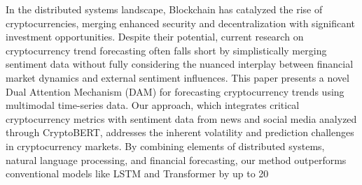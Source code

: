In the distributed systems landscape, Blockchain has catalyzed the rise of cryptocurrencies, merging enhanced security and decentralization with significant investment opportunities. Despite their potential, current research on cryptocurrency trend forecasting often falls short by simplistically merging sentiment data without fully considering the nuanced interplay between financial market dynamics and external sentiment influences. This paper presents a novel Dual Attention Mechanism (DAM) for forecasting cryptocurrency trends using multimodal time-series data. Our approach, which integrates critical cryptocurrency metrics with sentiment data from news and social media analyzed through CryptoBERT, addresses the inherent volatility and prediction challenges in cryptocurrency markets. By combining elements of distributed systems, natural language processing, and financial forecasting, our method outperforms conventional models like LSTM and Transformer by up to 20\
